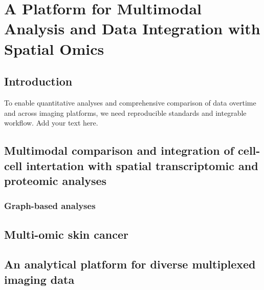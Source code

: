 \chapter[A Platform for Multimodal Analysis and Data Integration with Spatial Omics]{A Platform for Multimodal Analysis and Data Integration with Spatial Omics}
\label{Chap:4}	%
\pagestyle{headings}
\section{Introduction}
\label{Sec:4.1_intro}	%
To enable quantitative analyses and comprehensive comparison of data overtime and across imaging platforms, we need reproducible standards and integrable workflow.   
Add your text here. 

\section{Multimodal comparison and integration of cell-cell intertation with spatial transcriptomic and proteomic analyses}
\label{Sec:4.2_Cell_communities}	%
\subsection{Graph-based analyses}
\subsection{}

\subsection{}
\section{Multi-omic skin cancer}



\section{An analytical platform for diverse multiplexed imaging data}
\label{Sec:4.3_quantitative_validation}	%
\subsection{}

% 

% 